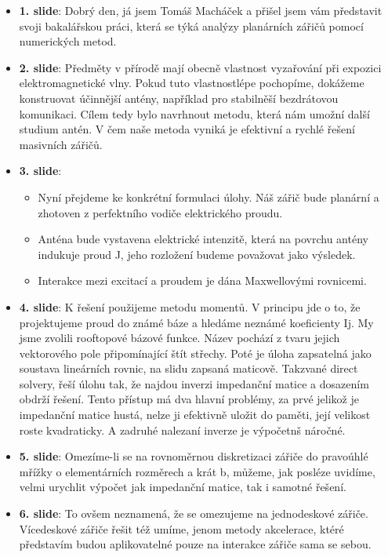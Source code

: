 \documentclass[12pt]{article}
\begin{document}
    \begin{itemize}
        \item \textbf{1. slide}: Dobrý den, já jsem Tomáš Macháček a přišel jsem vám představit svoji bakalářskou práci, která se týká analýzy planárních zářičů pomocí numerických metod.
        \item \textbf{2. slide}: Předměty v přírodě mají obecně vlastnost vyzařování při expozici elektromagnetické vlny. Pokud tuto vlastnostlépe pochopíme, dokážeme konstruovat účinnější antény, například pro stabilněší bezdrátovou komunikaci. Cílem tedy bylo navrhnout metodu, která nám umožní další studium antén. V čem naše metoda vyniká je efektivní a rychlé řešení masivních zářičů.
        \item \textbf{3. slide}:
            \begin{itemize}
                \item Nyní přejdeme ke konkrétní formulaci úlohy. Náš zářič bude planární a zhotoven z perfektního vodiče elektrického proudu.
                \item Anténa bude vystavena elektrické intenzitě, která na povrchu antény indukuje proud J, jeho rozložení budeme považovat jako výsledek.
                \item Interakce mezi excitací a proudem je dána Maxwellovými rovnicemi.
            \end{itemize}
        \item \textbf{4. slide}: K řešení použijeme metodu momentů. V principu jde o to, že projektujeme proud do známé báze a hledáme neznámé koeficienty Ij. My jsme zvolili rooftopové bázové funkce. Název pochází z tvaru jejich vektorového pole připomínající štít střechy. Poté je úloha zapsatelná jako soustava lineárních rovnic, na slidu zapsaná maticově. Takzvané direct solvery, řeší úlohu tak, že najdou inverzi impedanční matice a dosazením obdrží řešení. Tento přístup má dva hlavní problémy, za prvé jelikož je impedanční matice hustá, nelze ji efektivně uložit do paměti, její velikost roste kvadraticky. A zadruhé nalezaní inverze je výpočetnš náročné.
        \item \textbf{5. slide}: Omezíme-li se na rovnoměrnou diskretizaci zářiče do pravoúhlé mřížky o elementárních rozměrech a krát b, můžeme, jak posléze uvidíme, velmi urychlit výpočet jak impedanční matice, tak i samotné řešení.
        \item \textbf{6. slide}: To ovšem neznamená, že se omezujeme na jednodeskové zářiče. Vícedeskové zářiče řešit též umíme, jenom metody akcelerace, ktéré představím budou aplikovatelné pouze na interakce zářiče sama se sebou.

\end{itemize}
\end{document}
